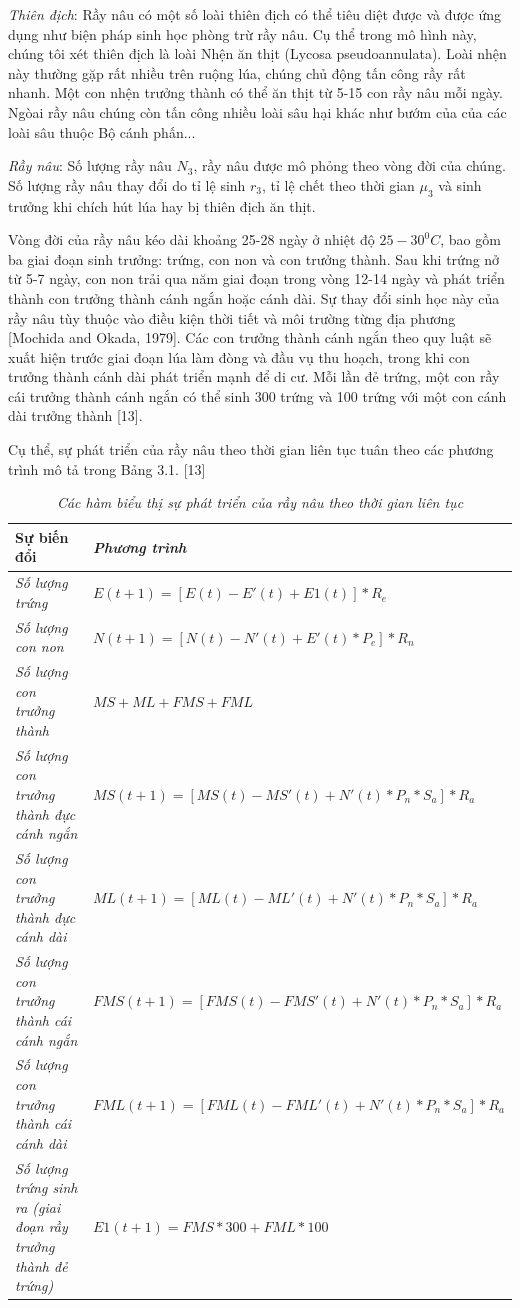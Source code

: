\documentclass[13pt]{extreport}
\begin{document}
\textit{Thiên địch}: Rầy nâu có một số loài  thiên địch có thể tiêu diệt được và được
ứng dụng như biện pháp sinh học phòng trừ rầy nâu. Cụ thể trong mô hình này, chúng tôi xét thiên địch là loài Nhện ăn thịt (Lycosa  pseudoannulata). Loài nhện này thường gặp rất 
nhiều trên ruộng lúa, chúng chủ động tấn công rầy rất nhanh. Một 
con nhện trưởng thành có thể ăn thịt từ 5-15 con rầy nâu mỗi 
ngày. Ngòai rầy nâu chúng còn tấn công nhiều loài sâu hại khác 
như  bướm của của các loài sâu thuộc Bộ cánh phấn...

\textit{Rầy nâu}: Số lượng rầy nâu $N_3$, rầy nâu được mô phỏng theo vòng đời của chúng. Số lượng rầy nâu thay đổi do tỉ lệ sinh  $r_3$, tỉ lệ chết theo thời gian  $\mu_3$ và sinh trưởng khi chích hút lúa hay bị thiên địch ăn thịt.

Vòng đời của rầy nâu kéo dài khoảng 25-28 ngày ở nhiệt độ $25-30^0C$, bao gồm ba giai đoạn sinh trưởng: trứng, con non và con trưởng thành. Sau khi trứng nở từ 5-7 ngày, con non trải qua năm giai đoạn trong vòng 12-14 ngày và phát triển thành con trưởng thành cánh ngắn hoặc cánh dài. Sự thay đổi sinh học này của rầy nâu tùy thuộc vào điều kiện thời tiết và môi trường từng địa phương [Mochida and Okada, 1979]. Các con trưởng thành cánh ngắn theo quy luật sẽ xuất hiện trước giai đoạn lúa làm đòng và đầu vụ thu hoạch, trong khi con trưởng thành cánh dài phát triển mạnh để di cư. Mỗi lần đẻ trứng, một con rầy cái trưởng thành cánh ngắn có thể sinh 300 trứng và 100 trứng với một con cánh dài trưởng thành [13].

Cụ thể, sự phát triển của rầy nâu theo thời gian liên tục tuân theo các phương trình mô tả trong Bảng 3.1. [13]
\begin{table}
\begin{tabular}{m{7cm} m{8cm}}
\hline
{Sự biến đổi} & \textit{Phương trình} \\ 
\hline
\textit{Số lượng trứng} & $E(t+1) = [E(t)-E'(t)+E1(t)]*R_e$ \\ 
\hline
\textit{Số lượng con non} & $N(t+1)=[N(t)-N'(t)+E'(t)*P_e]*R_n$ \\ 
\hline
\textit{Số lượng con trưởng thành} & $MS+ML+FMS+FML$ \\
\hline
\textit{Số lượng con trưởng thành đực cánh ngắn} & $MS(t+1)=[MS(t)-MS'(t)+N'(t)*P_n*S_a]*R_a$ \\
\hline
\textit{Số lượng con trưởng thành đực cánh dài} & $ML(t+1)=[ML(t)-ML'(t)+N'(t)*P_n*S_a]*R_a$ \\
\hline
\textit{Số lượng con trưởng thành cái cánh ngắn} & $FMS(t+1)=[FMS(t)-FMS'(t)+N'(t)*P_n*S_a]*R_a$ \\
\hline
\textit{Số lượng con trưởng thành cái cánh dài} & $FML(t+1)=[FML(t)-FML'(t)+N'(t)*P_n*S_a]*R_a$ \\
\hline
\textit{Số lượng trứng sinh ra (giai đoạn rầy trưởng thành đẻ trứng)} & $E1(t+1)=FMS*300+FML*100$ \\
\hline
\end{tabular}
\caption{\textit{Các hàm biểu thị sự phát triển của rầy nâu theo thời gian liên tục}}
\end{table}
 
\end{document}
